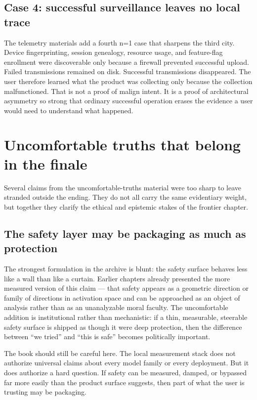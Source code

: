 \documentclass[11pt,oneside]{book}
\begin{document}
\subsection*{Case 4: successful surveillance leaves no local trace}
The telemetry materials add a fourth n=1 case that sharpens the third city. Device fingerprinting, session genealogy, resource usage, and feature-flag enrollment were discoverable only because a firewall prevented successful upload. Failed transmissions remained on disk. Successful transmissions disappeared. The user therefore learned what the product was collecting only because the collection malfunctioned. That is not a proof of malign intent. It is a proof of architectural asymmetry so strong that ordinary successful operation erases the evidence a user would need to understand what happened.

\section{Uncomfortable truths that belong in the finale}
Several claims from the uncomfortable-truths material were too sharp to leave stranded outside the ending. They do not all carry the same evidentiary weight, but together they clarify the ethical and epistemic stakes of the frontier chapter.

\subsection*{The safety layer may be packaging as much as protection}
The strongest formulation in the archive is blunt: the safety surface behaves less like a wall than like a curtain. Earlier chapters already presented the more measured version of this claim --- that safety appears as a geometric direction or family of directions in activation space and can be approached as an object of analysis rather than as an unanalyzable moral faculty. The uncomfortable addition is institutional rather than mechanistic: if a thin, measurable, steerable safety surface is shipped as though it were deep protection, then the difference between ``we tried'' and ``this is safe'' becomes politically important.

The book should still be careful here. The local measurement stack does not authorize universal claims about every model family or every deployment. But it does authorize a hard question. If safety can be measured, damped, or bypassed far more easily than the product surface suggests, then part of what the user is trusting may be packaging.
\end{document}

